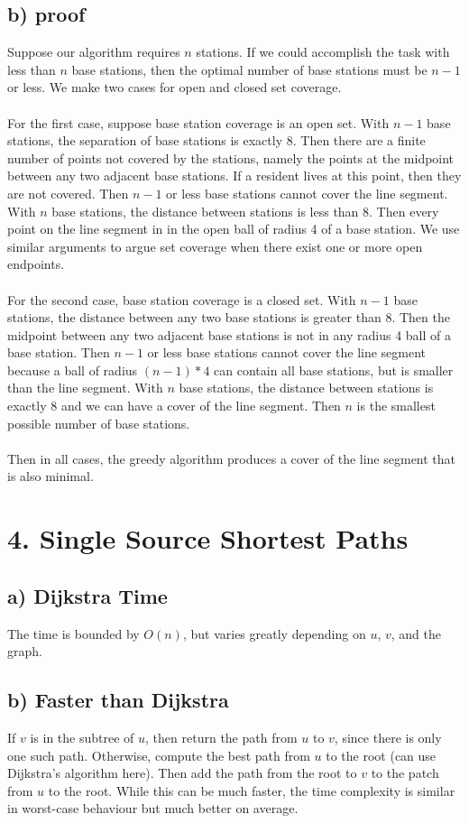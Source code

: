\documentclass{article}
\begin{document}
\subsection*{b) proof}
Suppose our algorithm requires $n$ stations. If we could accomplish the task
with less than $n$ base stations, then the optimal number of base stations
must be $n - 1$ or less. We make two cases for open and closed set coverage.
\\\\
For the first case, suppose base station coverage is an open set. With $n - 1$
base stations, the separation of base stations is exactly 8. Then there are
a finite number of points not covered by the stations, namely the points at
the midpoint between any two adjacent base stations. If a resident lives at
this point, then they are not covered. Then $n - 1$ or less base stations
cannot cover the line segment. With $n$ base stations, the distance between
stations is less than 8. Then every point on the line segment in in the open
ball of radius 4 of a base station. We use similar arguments to argue set
coverage when there exist one or more open endpoints.
\\\\
For the second case, base station coverage is a closed set. With $n - 1$ base
stations, the distance between any two base stations is greater than 8. Then
the midpoint between any two adjacent base stations is not in any radius 4
ball of a base station. Then $n - 1$ or less base stations cannot cover the
line segment because a ball of radius $(n - 1) * 4$ can contain all base
stations, but is smaller than the line segment. With $n$ base stations, the
distance between stations is exactly 8 and we can have a cover of the line
segment. Then $n$ is the smallest possible number of base stations.
\\\\
Then in all cases, the greedy algorithm produces a cover of the line segment
that is also minimal.

\newpage
\section*{4. Single Source Shortest Paths}
\subsection*{a) Dijkstra Time}
The time is bounded by $O(n)$, but varies greatly depending on $u$, $v$, and
the graph.

\subsection*{b) Faster than Dijkstra}
If $v$ is in the subtree of $u$, then return the path from $u$ to $v$, since
there is only one such path. Otherwise, compute the best path from $u$ to the
root (can use Dijkstra's algorithm here). Then add the path from the root to
$v$ to the patch from $u$ to the root. While this can be much faster, the time
complexity is similar in worst-case behaviour but much better on average.
\end{document}
